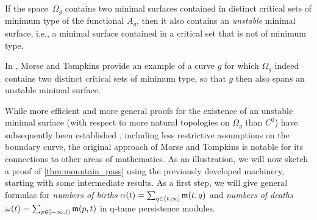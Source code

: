 \begin{thm}
\label{thm:unstable_minimial_surface}
	If the space~$\Omega_g$ contains two minimal surfaces contained in distinct critical sets of minimum type of the functional $A_g$, then it also contains an \emph{unstable} minimal surface, i.e., a minimal surface contained in a critical set that is not of minimum type.
\end{thm}

In \cite[Section 8]{Morse.1939}, Morse and Tompkins provide an example of a curve $g$ for which $\Omega_{g}$ indeed contains two distinct critical sets of minimum type, so that $g$ then also spans an unstable minimal surface.

While more efficient and more general proofs for the existence of an unstable minimal surface (with respect to more natural topologies on $\Omega_{g}$ than $C^0$) have subsequently been established \cite{Struwe.1988,Dierkes.2010}, including less restrictive assumptions on the boundary curve, the original approach of Morse and Tompkins is notable
for its connections to other areas of mathematics.
As an illustration, we will now sketch a proof of \cref{thm:mountain_pass} using the previously developed machinery, starting with some intermediate results.
As a first step, we will give general formulas for \emph{numbers of births} $\alpha(t) = \sum_{q \in (t, \infty]} \mathfrak{m}(t,q)$ and \emph{numbers of deaths} $\omega(t) = \sum_{p \in [-\infty, t)} \mathfrak{m}(p,t)$ in q-tame persistence modules.

